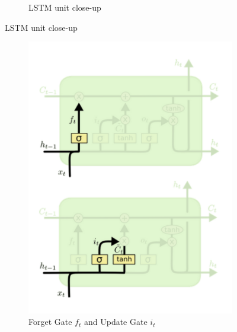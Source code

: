 \begin{figure}[H]
\begin{subfigure}[b]{0.30\textwidth}
        \caption{LSTM unit close-up}
    \end{subfigure}
\end{figure}

\begin{figure}[H]
    \centering
    \begin{subfigure}[b]{0.4\textwidth}
        \includegraphics[width=\linewidth]{img/LSTM_unit.png}
        \caption{Forget Gate $f_t$ and Update Gate $i_t$}
    \end{subfigure}
    \begin{subfigure}[b]{0.4\textwidth}

\end{subfigure}
\end{figure}
